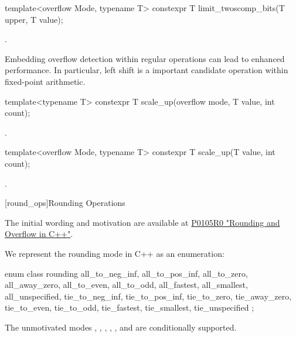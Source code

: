 \begin{addedblock}
\begin{itemdecl}
template<overflow Mode, typename T>
constexpr T limit_twoscomp_bits(T upper, T value);
\end{itemdecl}

\begin{itemdescr}
\returns {}.
\end{itemdescr}

Embedding overflow detection within regular operations can lead to enhanced performance. In particular, left shift is a important candidate operation within fixed-point arithmetic.

\begin{itemdecl}
template<typename T>
constexpr T scale_up(overflow mode, T value, int count);
\end{itemdecl}

\begin{itemdescr}
\returns {}.
\end{itemdescr}

\begin{itemdecl}
template<overflow Mode, typename T>
constexpr T scale_up(T value, int count);
\end{itemdecl}

\begin{itemdescr}
\returns {}.
\end{itemdescr}

[round_ops]{Rounding Operations}
\begin{reviewnote}
The initial wording and motivation are available at \href{http://www.open-std.org/jtc1/sc22/wg21/docs/papers/2015/p0105r0.html}{P0105R0 "Rounding and Overflow in C++"}.
\end{reviewnote}

We represent the rounding mode in C++ as an enumeration:

\begin{codeblock}
enum class rounding {
  all_to_neg_inf, all_to_pos_inf,
  all_to_zero, all_away_zero,
  all_to_even, all_to_odd,
  all_fastest, all_smallest,
  all_unspecified,
  tie_to_neg_inf, tie_to_pos_inf,
  tie_to_zero, tie_away_zero,
  tie_to_even, tie_to_odd,
  tie_fastest, tie_smallest,
  tie_unspecified
};
\end{codeblock}

The unmotivated modes , , , , , and  are conditionally supported.


\end{addedblock}
